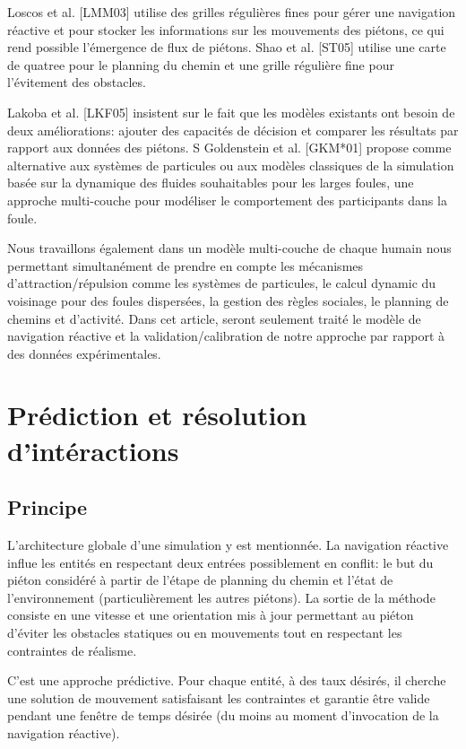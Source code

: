 \documentclass[11pt]{article}
\begin{document}
Loscos et al. [LMM03] utilise des grilles régulières fines pour gérer une navigation réactive et pour stocker les informations sur les mouvements des piétons, ce qui rend possible l'émergence de flux de piétons. Shao et al. [ST05] utilise une carte de quatree pour le planning du chemin et une grille régulière fine pour l'évitement des obstacles.

Lakoba et al. [LKF05] insistent sur le fait que les modèles existants ont besoin de deux améliorations: ajouter des capacités de décision et comparer les résultats par rapport aux données des piétons. S Goldenstein et al. [GKM*01] propose comme alternative aux systèmes de particules ou aux modèles classiques de la simulation basée sur la dynamique des fluides souhaitables pour les larges foules, une approche multi-couche pour modéliser le comportement des participants dans la foule.

Nous travaillons également dans un modèle multi-couche de chaque humain nous permettant simultanément de prendre en compte les mécanismes d'attraction/répulsion comme les systèmes de particules, le calcul dynamic du voisinage pour des foules dispersées, la gestion des règles sociales, le planning de chemins et d'activité. Dans cet article, seront seulement traité le modèle de navigation réactive et la validation/calibration de notre approche par rapport à des données expérimentales.

\section{Prédiction et résolution d'intéractions}

\subsection{Principe}

L'architecture globale d'une simulation y est mentionnée.
La navigation réactive influe les entités en respectant deux entrées possiblement en conflit: le but du piéton considéré à partir de l'étape de planning du chemin et l'état de l'environnement (particulièrement les autres piétons). La sortie de la méthode consiste en une vitesse et une orientation mis à jour permettant au piéton d'éviter les obstacles statiques ou en mouvements tout en respectant les contraintes de réalisme.

C'est une approche prédictive. Pour chaque entité, à des taux désirés, il cherche une solution de mouvement satisfaisant les contraintes et garantie être valide pendant une fenêtre de temps désirée (du moins au moment d'invocation de la navigation réactive). 
\end{document}
